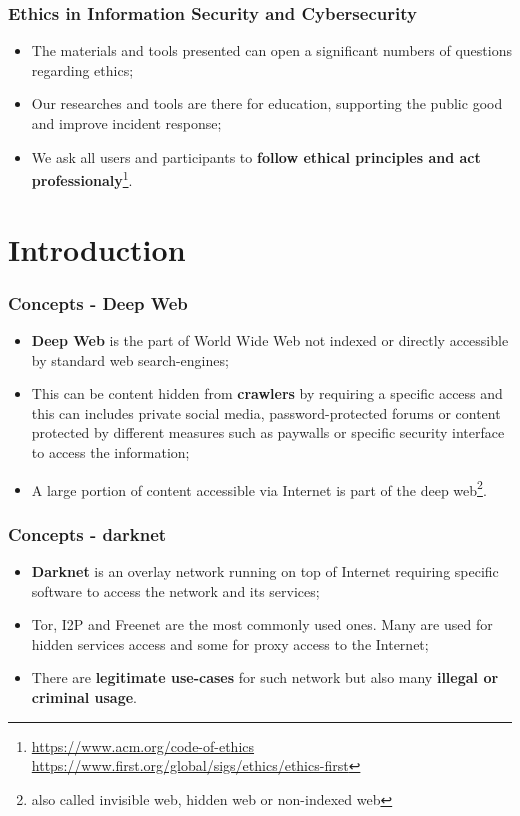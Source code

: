 \documentclass{beamer}
\begin{document}
\begin{frame}
        \frametitle{Ethics in Information Security and Cybersecurity}
        \begin{itemize}
        \item The materials and tools presented can open a significant numbers of questions regarding ethics;
        \item Our researches and tools are there for education, supporting the public good and improve incident response;
        \item We ask all users and participants to {\bf follow ethical principles and act professionaly}\footnote{\url{https://www.acm.org/code-of-ethics} \url{https://www.first.org/global/sigs/ethics/ethics-first}}.
        \end{itemize}
\end{frame}

\section{Introduction}
\begin{frame}
        \frametitle{Concepts - Deep Web}
        \begin{itemize}
                \item {\bf Deep Web} is the part of World Wide Web not indexed or directly accessible by standard web search-engines;
                \item This can be content hidden from {\bf crawlers} by requiring a specific access and this can includes private social media, password-protected forums or content protected
                        by different measures such as paywalls or specific security interface to access the information;
                \item A large portion of content accessible via Internet is part of the deep web\footnote{also called invisible web, hidden web or non-indexed web}.
        \end{itemize}
\end{frame}

\begin{frame}
        \frametitle{Concepts - darknet}
        \begin{itemize}
                \item {\bf Darknet} is an overlay network running on top of Internet requiring specific software to access the network and its services;
                \item Tor, I2P and Freenet are the most commonly used ones. Many are used for hidden services access and some for proxy access to the Internet;
		\item There are {\bf legitimate use-cases} for such network but also many {\bf illegal or criminal usage}.
        \end{itemize}
\end{frame}
\end{document}
